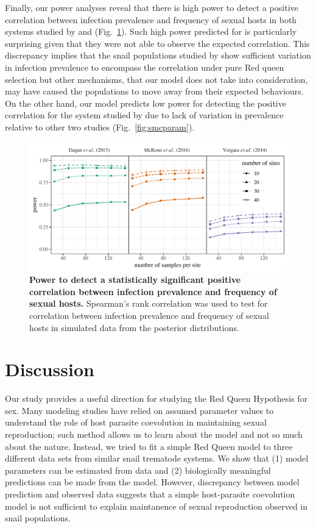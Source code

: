 \documentclass{article}\usepackage[]{graphicx}\usepackage[]{color}
\newcommand{\fref}[1]{Fig.~\ref{fig:#1}}
\begin{document}
Finally, our power analyses reveal that there is high power to detect a positive correlation between infection prevalence and frequency of sexual hosts in both systems studied by \cite{dagan2013clonal} and \cite{mckone2016fine} (\fref{power}).
Such high power predicted for \cite{dagan2013clonal} is particularly surprising given that they were not able to observe the expected correlation.
This discrepancy implies that the snail populations studied by \cite{dagan2013clonal} show sufficient variation in infection prevalence to encompass the correlation under pure Red queen selection but other mechanisms, that our model does not take into consideration, may have caused the populations to move away from their expected behaviours.
On the other hand, our model predicts low power for detecting the positive correlation for the system studied by \cite{vergara2014infection} due to lack of variation in prevalence relative to other two studies (\fref{smcparam}).

\begin{figure}[!ht]
\includegraphics[width=\textwidth]{../fig/power.pdf}
\caption{{\bf Power to detect a statistically significant positive correlation between infection prevalence and frequency of sexual hosts.}
Spearman's rank correlation was used to test for correlation between infection prevalence and frequency of sexual hosts in simulated data from the posterior distributions.
}
\label{fig:power}
\end{figure}

\section{Discussion}

Our study provides a useful direction for studying the Red Queen Hypothesis for sex.
Many modeling studies have relied on assumed parameter values to understand the role of host parasite coevolution in maintaining sexual reproduction; 
such method allows us to learn about the model and not so much about the nature.
Instead, we tried to fit a simple Red Queen model to three different data sets from similar snail trematode systems.
We show that (1) model parameters can be estimated from data and (2) biologically meaningful predictions can be made from the model.
However, discrepancy between model prediction and observed data suggests that a simple host-parasite coevolution model is not sufficient to explain maintanence of sexual reproduction observed in snail populations.
\end{document}
